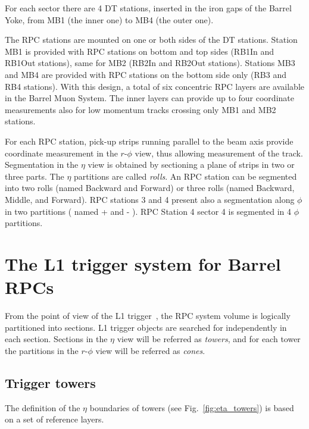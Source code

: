 For each sector there are 4 DT stations, inserted in the 
iron gaps of the Barrel Yoke, from MB1 (the inner one)
to MB4 (the outer one). 

The RPC stations are mounted on one or both sides of the DT 
stations. Station MB1 is provided with RPC stations on 
bottom and top sides (RB1In and RB1Out stations), same 
for MB2 (RB2In and RB2Out stations). Stations MB3 and MB4
are provided with RPC stations on the bottom side only
(RB3 and RB4 stations). 
With this design, a total of six concentric RPC layers are 
available in the Barrel Muon System. The inner
layers can provide up to four coordinate measurements also for 
low momentum tracks crossing only MB1 and MB2 stations.

For each RPC station, pick-up strips running parallel to the 
beam axis provide coordinate measurement in the $r$-$\phi$ view,
thus allowing \pt measurement of the track. 
Segmentation in the $\eta$ view is obtained by sectioning
a plane of strips in two or three parts. 
The $\eta$ partitions are called {\em rolls}.
An RPC station can be segmented into two rolls (named Backward and 
Forward) or three rolls (named Backward, Middle, and Forward).
RPC stations 3 and 4 present also a segmentation along $\phi$ in two 
partitions ( named + and - ). RPC Station 4 sector 4 is segmented in 4 $\phi$ partitions.

\section{The L1 trigger system for Barrel RPCs}
From the point of view of the L1 trigger~\cite{ref:trig_tdr}, 
the RPC system volume is logically partitioned into 
sections. L1 trigger objects are searched 
for independently in each section.
Sections in the $\eta$ view will be referred as {\em towers},
and for each tower the partitions in  
the $r$-$\phi$ view will be referred as {\em cones}.


\subsection{Trigger towers}
\label{sec:trig_towers}
The definition of the $\eta$ boundaries 
of towers (see Fig.~\ref{fig:eta_towers}) is based on a set 
of reference layers.


